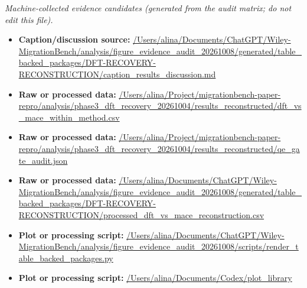 \emph{Machine-collected evidence candidates (generated from the audit matrix; do not edit this file).}
\begin{itemize}[leftmargin=1.4em,noitemsep]
\item \textbf{Caption/discussion source:} \url{/Users/alina/Documents/ChatGPT/Wiley-MigrationBench/analysis/figure_evidence_audit_20261008/generated/table_backed_packages/DFT-RECOVERY-RECONSTRUCTION/caption_results_discussion.md}
\item \textbf{Raw or processed data:} \url{/Users/alina/Project/migrationbench-paper-repro/analysis/phase3_dft_recovery_20261004/results_reconstructed/dft_vs_mace_within_method.csv}
\item \textbf{Raw or processed data:} \url{/Users/alina/Project/migrationbench-paper-repro/analysis/phase3_dft_recovery_20261004/results_reconstructed/qe_gate_audit.json}
\item \textbf{Raw or processed data:} \url{/Users/alina/Documents/ChatGPT/Wiley-MigrationBench/analysis/figure_evidence_audit_20261008/generated/table_backed_packages/DFT-RECOVERY-RECONSTRUCTION/processed_dft_vs_mace_reconstruction.csv}
\item \textbf{Plot or processing script:} \url{/Users/alina/Documents/ChatGPT/Wiley-MigrationBench/analysis/figure_evidence_audit_20261008/scripts/render_table_backed_packages.py}
\item \textbf{Plot or processing script:} \url{/Users/alina/Documents/Codex/plot_library}
\end{itemize}
